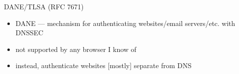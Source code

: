\begin{frame}{DANE/TLSA (RFC 7671)}
    \begin{itemize}
    \item DANE --- mechanism for authenticating websites/email servers/etc. with DNSSEC
    \item not supported by any browser I know of
    \vspace{.5cm}
    \item instead, authenticate websites [mostly] separate from DNS
    \end{itemize}
\end{frame}

